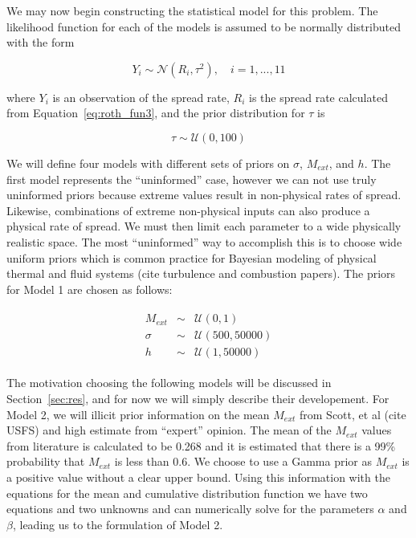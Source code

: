 \documentclass[11pt]{article}
\begin{document}
We may now begin constructing the statistical model for this problem. The likelihood function for each of the models is assumed to be normally distributed with the form

\begin{equation}
Y_i \sim \mathcal{N}(R_i,\tau^2),\quad i = 1,...,11
\label{eq:like}
\end{equation}

\noindent where $Y_i$ is an observation of the spread rate, $R_i$ is the spread rate calculated from Equation~\ref{eq:roth_fun3}, and the prior distribution for $\tau$ is

\begin{equation}
\tau \sim \mathcal{U}(0,100)
\label{eq:tau_prior}
\end{equation}

We will define four models with different sets of priors on $\sigma$, $M_{ext}$, and $h$. The first model represents the ``uninformed'' case, however we can not use truly uninformed priors because extreme values result in non-physical rates of spread. Likewise, combinations of extreme non-physical inputs can also produce a physical rate of spread. We must then limit each parameter to a wide physically realistic space. The most ``uninformed'' way to accomplish this is to choose wide uniform priors which is common practice for Bayesian modeling of physical thermal and fluid systems (cite turbulence and combustion papers). The priors for Model 1 are chosen as follows:

\begin{align}
\begin{array}{ccc}
M_{ext} &\sim& \mathcal{U}(0,1) \\
\sigma &\sim& \mathcal{U}(500,50000) \\
h &\sim& \mathcal{U}(1,50000)
\end{array}
\label{eq:mod1_priors}
\end{align}

The motivation choosing the following models will be discussed in Section~\ref{sec:res}, and for now we will simply describe their developement. For Model 2, we will illicit prior information on the mean $M_{ext}$ from Scott, et al (cite USFS) and high estimate from ``expert'' opinion. The mean of the $M_{ext}$ values from literature is calculated to be 0.268 and it is estimated that there is a 99\% probability that $M_{ext}$ is less than 0.6. We choose to use a Gamma prior as $M_{ext}$ is a positive value without a clear upper bound. Using this information with the equations for the mean and cumulative distribution function we have two equations and two unknowns and can numerically solve for the parameters $\alpha$ and $\beta$, leading us to the formulation of Model 2.
\end{document}
